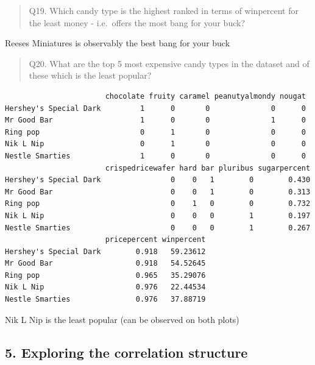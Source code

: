 \documentclass[
  letterpaper,
  DIV=11,
  numbers=noendperiod]{scrartcl}
\newenvironment{Shaded}{\begin{snugshade}}{\end{snugshade}}
\newcommand{\AttributeTok}[1]{\textcolor[rgb]{0.40,0.45,0.13}{#1}}
\newcommand{\DecValTok}[1]{\textcolor[rgb]{0.68,0.00,0.00}{#1}}
\newcommand{\FunctionTok}[1]{\textcolor[rgb]{0.28,0.35,0.67}{#1}}
\newcommand{\NormalTok}[1]{\textcolor[rgb]{0.00,0.23,0.31}{#1}}
\newcommand{\SpecialCharTok}[1]{\textcolor[rgb]{0.37,0.37,0.37}{#1}}
\begin{document}
\begin{quote}
Q19. Which candy type is the highest ranked in terms of winpercent for
the least money - i.e.~offers the most bang for your buck?
\end{quote}

Reeses Miniatures is observably the best bang for your buck

\begin{quote}
Q20. What are the top 5 most expensive candy types in the dataset and of
these which is the least popular?
\end{quote}

\begin{Shaded}
\end{Shaded}

\begin{verbatim}
                       chocolate fruity caramel peanutyalmondy nougat
Hershey's Special Dark         1      0       0              0      0
Mr Good Bar                    1      0       0              1      0
Ring pop                       0      1       0              0      0
Nik L Nip                      0      1       0              0      0
Nestle Smarties                1      0       0              0      0
                       crispedricewafer hard bar pluribus sugarpercent
Hershey's Special Dark                0    0   1        0        0.430
Mr Good Bar                           0    0   1        0        0.313
Ring pop                              0    1   0        0        0.732
Nik L Nip                             0    0   0        1        0.197
Nestle Smarties                       0    0   0        1        0.267
                       pricepercent winpercent
Hershey's Special Dark        0.918   59.23612
Mr Good Bar                   0.918   54.52645
Ring pop                      0.965   35.29076
Nik L Nip                     0.976   22.44534
Nestle Smarties               0.976   37.88719
\end{verbatim}

Nik L Nip is the least popular (can be observed on both plots)

\subsection{5. Exploring the correlation
structure}\label{exploring-the-correlation-structure}
\end{document}
